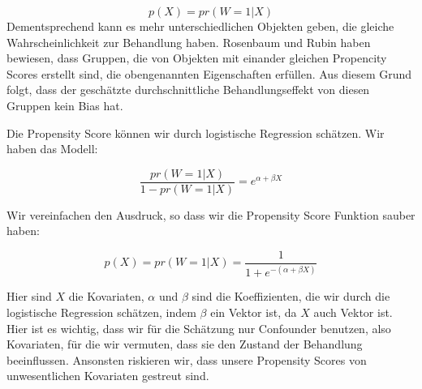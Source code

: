\documentclass[12pt,a4paper,twoside]{scrartcl}
\numberwithin{equation}{section}
\begin{document}
\begin{equation}\label{eq:2.6}
 p(X) = pr(W=1|X)
\end{equation}
Dementsprechend kann es mehr unterschiedlichen Objekten geben, die gleiche Wahrscheinlichkeit zur Behandlung haben. Rosenbaum und Rubin haben bewiesen, dass Gruppen, die von Objekten mit einander gleichen Propencity Scores erstellt sind, die obengenannten Eigenschaften erfüllen. Aus diesem Grund folgt, dass der geschätzte durchschnittliche Behandlungseffekt von diesen Gruppen kein Bias hat\cite{rosenbaum1983central}. \par 

\noindent 
Die Propensity Score können wir durch logistische Regression schätzen. Wir haben das Modell:\par

\begin{equation}\label{eq:2.7}
  \frac{pr(W=1|X)}{1-pr(W=1|X)} = e^{\alpha+\beta X}
\end{equation}

\noindent
Wir vereinfachen den Ausdruck, so dass wir die Propensity Score Funktion sauber haben:\par

\begin{equation}\label{eq:2.8}
  p(X)= pr(W=1|X) = \frac{1}{1 + e^{-(\alpha+\beta X)}}
\end{equation}

\noindent
Hier sind $X$ die Kovariaten, $\alpha$ und $\beta$ sind die Koeffizienten, die wir durch die logistische Regression schätzen, indem $\beta$ ein Vektor ist, da $X$ auch Vektor ist. Hier ist es wichtig, dass wir für die Schätzung nur Confounder benutzen, also Kovariaten, für die wir vermuten, dass sie den Zustand der Behandlung beeinflussen. Ansonsten riskieren wir, dass unsere Propensity Scores von unwesentlichen Kovariaten gestreut sind.\par 
\end{document}
